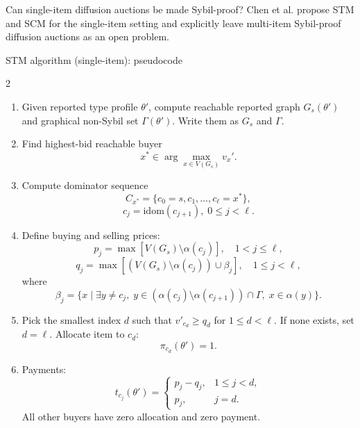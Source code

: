 \documentclass[10pt,aspectratio=169]{beamer}
\newcommand{\question}[1]{\begin{alertblock}{Question}#1\end{alertblock}}
\begin{document}
\begin{frame}{Can single-item diffusion auctions be made Sybil-proof?}
{\tiny Chen et al. propose STM and SCM for the single-item setting and explicitly leave multi-item Sybil-proof diffusion auctions as an open problem.}
\end{frame}

\begin{frame}{STM algorithm (single-item): pseudocode}
  \begin{multicols}{2}
  \scriptsize
  \begin{enumerate}
  \item Given reported type profile $\theta'$, compute reachable reported graph $G_s(\theta')$ and graphical non-Sybil set $\Gamma(\theta')$. Write them as $G_s$ and $\Gamma$.
  \item Find highest-bid reachable buyer
  \[
    x^* \in \arg\max_{x \in V(G_s)} v_x'.
  \]
  \item Compute dominator sequence
  \[
    C_{x^*}=\{c_0=s,c_1,\ldots,c_\ell=x^*\},
    \]
    \[
    c_j=\mathrm{idom}(c_{j+1}),\;0\le j<\ell.
  \]
  \item Define buying and selling prices:
  \[
    p_j = \max\!\left[V(G_s)\setminus \alpha(c_j)\right],\quad 1<j\le \ell,
  \]
  \[
    q_j = \max\!\left[(V(G_s)\setminus \alpha(c_j))\cup \beta_j\right],\quad 1\le j<\ell,
  \]
  where
  \[
    \beta_j = \{x\mid \exists y\ne c_j,\; y\in (\alpha(c_j)\setminus\alpha(c_{j+1}))\cap\Gamma,\; x\in\alpha(y)\}.
  \]
  \item Pick the smallest index $d$ such that $v'_{c_d}\ge q_d$ for $1\le d<\ell$. If none exists, set $d=\ell$. Allocate item to $c_d$:
  \[
    \pi_{c_d}(\theta')=1.
  \]
  \item Payments:
  \[
    t_{c_j}(\theta')=
    \begin{cases}
      p_j-q_j, & 1\le j<d,\\
      p_j, & j=d.
    \end{cases}
  \]
  All other buyers have zero allocation and zero payment.
\end{enumerate}
\end{multicols}

\end{frame}
\end{document}
